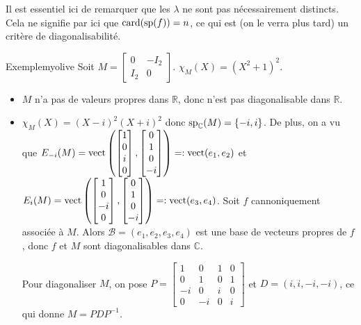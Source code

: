     Il est essentiel ici de remarquer que les $\lambda$ ne sont pas nécessairement distincts. Cela ne signifie par ici que $\card(\sp(f)) = n$, ce qui est (on le verra plus tard) un critère de diagonalisabilité.

    \begin{omed}{Exemple}{myolive}
        Soit $M = \begin{bmatrix}
            0 & -I_2 \\
            I_2 & 0
        \end{bmatrix}$. $\chi_M(X) = (X^2 + 1)^2$.
        \begin{itemize}
            \item $M$ n’a pas de valeurs propres dans $\mathbb{R}$, donc n’est pas diagonalisable dans $\mathbb{R}$.
            \item $\chi_M(X) = (X-i)^2 (X+i)^2$ donc $\sp_{\mathbb{C}}(M) = \left\{-i, i\right\}$. De plus, on a vu que $E_{-i}(M) = \vect\left(\begin{bmatrix}
                    1 \\
                    0 \\
                    i \\
                    0
                \end{bmatrix}, \begin{bmatrix}
                    0 \\ 
                    1 \\
                    0 \\
                    -i
                \end{bmatrix}\right) =: \vect(e_1, e_2)$ et $E_{i}(M) = \vect\left(\begin{bmatrix}
                    1 \\
                    0 \\
                    -i \\
                    0
                \end{bmatrix}, \begin{bmatrix}
                    0 \\
                    1 \\
                    0 \\
                    -i
                \end{bmatrix}\right) =: \vect(e_3, e_4)$. Soit $f$ cannoniquement associée à $M$. Alors $\mathcal{B} = (e_1, e_2, e_3, e_4)$ est une base de vecteurs propres de $f$, donc $f$ et $M$ sont diagonalisables dans $\mathbb{C}$.
                
                Pour diagonaliser $M$, on pose $P = \begin{bmatrix}
                    1 & 0 & 1 & 0 \\
                    0 & 1 & 0 & 1 \\
                    -i & 0 & i & 0 \\
                    0 & -i & 0 & i
                \end{bmatrix}$ et $D = (i, i, -i, -i)$, ce qui donne $M = P D P^{-1}$.
        \end{itemize}
    \end{omed}

